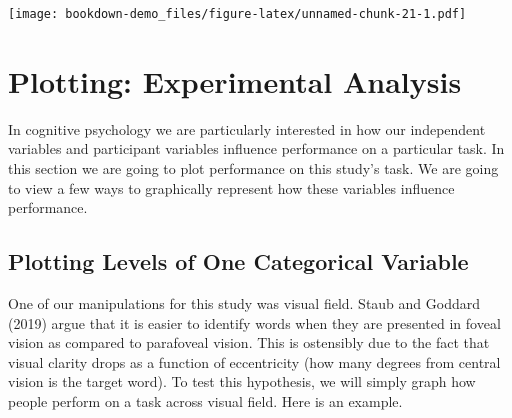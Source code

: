 \documentclass[]{book}
\newenvironment{Shaded}{\begin{snugshade}}{\end{snugshade}}
\newcommand{\KeywordTok}[1]{\textcolor[rgb]{0.13,0.29,0.53}{\textbf{#1}}}
\newcommand{\DataTypeTok}[1]{\textcolor[rgb]{0.13,0.29,0.53}{#1}}
\newcommand{\FloatTok}[1]{\textcolor[rgb]{0.00,0.00,0.81}{#1}}
\newcommand{\StringTok}[1]{\textcolor[rgb]{0.31,0.60,0.02}{#1}}
\newcommand{\OperatorTok}[1]{\textcolor[rgb]{0.81,0.36,0.00}{\textbf{#1}}}
\newcommand{\NormalTok}[1]{#1}
\begin{document}
\begin{Shaded}
\end{Shaded}

\texttt{[image: bookdown-demo\_files/figure-latex/unnamed-chunk-21-1.pdf]}

\section{Plotting: Experimental
Analysis}\label{plotting-experimental-analysis}

In cognitive psychology we are particularly interested in how our
independent variables and participant variables influence performance on
a particular task. In this section we are going to plot performance on
this study's task. We are going to view a few ways to graphically
represent how these variables influence performance.

\subsection{Plotting Levels of One Categorical
Variable}\label{plotting-levels-of-one-categorical-variable}

One of our manipulations for this study was visual field. Staub and
Goddard (2019) argue that it is easier to identify words when they are
presented in foveal vision as compared to parafoveal vision. This is
ostensibly due to the fact that visual clarity drops as a function of
eccentricity (how many degrees from central vision is the target word).
To test this hypothesis, we will simply graph how people perform on a
task across visual field. Here is an example.
\end{document}
